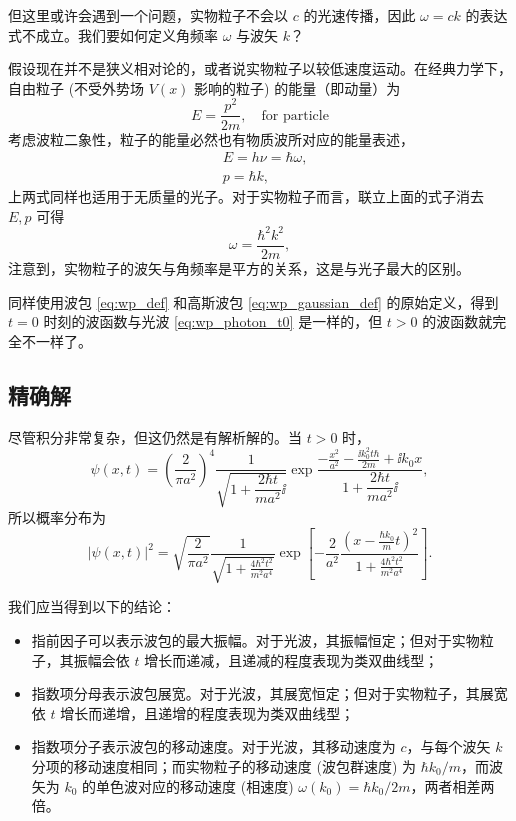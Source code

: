 但这里或许会遇到一个问题，实物粒子不会以 $c$ 的光速传播，因此 $\omega = ck$ 的表达式不成立。我们要如何定义角频率 $\omega$ 与波矢 $k$？

假设现在并不是狭义相对论的，或者说实物粒子以较低速度运动。在经典力学下，自由粒子 (不受外势场 $V (x)$ 影响的粒子) 的能量（即动量）为
\begin{equation}
    E = \frac{p^2}{2m}, \quad \text{for particle}
\end{equation}
考虑波粒二象性，粒子的能量必然也有物质波所对应的能量表述，
\begin{align}
    &E = h\nu = \hbar \omega, \\
    &p = \hbar k, 
\end{align}
上两式同样也适用于无质量的光子。对于实物粒子而言，联立上面的式子消去 $E,p$ 可得
\begin{equation}
    \omega = \frac{\hbar^2k^2}{2m},
\end{equation}
注意到，实物粒子的波矢与角频率是平方的关系，这是与光子最大的区别。

同样使用波包 \eqref{eq:wp_def} 和高斯波包 \eqref{eq:wp_gaussian_def} 的原始定义，得到 $t =0$ 时刻的波函数与光波 \eqref{eq:wp_photon_t0} 是一样的，但 $t > 0$ 的波函数就完全不一样了。

\subsection{精确解}
尽管积分非常复杂，但这仍然是有解析解的。当 $t > 0$ 时，
\begin{equation}
    \psi(x,t) = \left(\frac{2}{\pi a^2}\right)^4 \frac1 {\sqrt{ 1 + \dfrac{2\hbar t}{ma^2}\ii}} \exp \frac {\displaystyle -\frac{x^2}{a^2}-\frac{\ii k_0^2 t \hbar }{2 m}+\ii
    k_0 x} {1 + \dfrac{2\hbar t}{ma^2}\ii},
\end{equation}
所以概率分布为
\begin{equation}
    |\psi(x, t)|^2 = \sqrt{\frac{2}{\pi a^2}} \frac{1}{\sqrt{1 + \displaystyle \frac{4 \hbar^2 t^2}{m^2 a^4}}} \exp \left[ - \frac{2}{a^2} \frac{\left( x - \displaystyle \frac{\hbar k_0}{m} t \right)^2}{1 + \displaystyle \frac{4 \hbar^2 t^2}{m^2 a^4}} \right]. 
\end{equation}

我们应当得到以下的结论：
\begin{itemize}[nosep]
  \item 指前因子可以表示波包的最大振幅。对于光波，其振幅恒定；但对于实物粒子，其振幅会依 $t$ 增长而递减，且递减的程度表现为类双曲线型；
  \item 指数项分母表示波包展宽。对于光波，其展宽恒定；但对于实物粒子，其展宽依 $t$ 增长而递增，且递增的程度表现为类双曲线型；
  \item 指数项分子表示波包的移动速度。对于光波，其移动速度为 $c$，与每个波矢 $k$ 分项的移动速度相同；而实物粒子的移动速度 (波包群速度) 为 $\hbar k_0 / m$，而波矢为 $k_0$ 的单色波对应的移动速度 (相速度) $\omega(k_0) = \hbar k_0 / 2m$，两者相差两倍。
\end{itemize}

